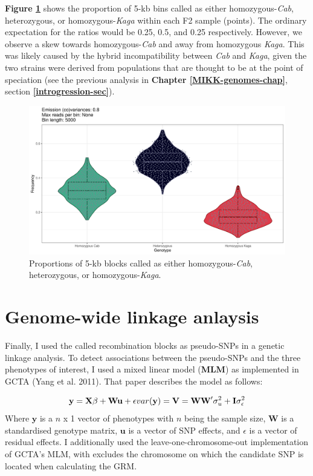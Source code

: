 \documentclass[
]{book}
\begin{document}
\textbf{Figure \ref{fig:prop-sites-total}} shows the proportion of 5-kb bins called as either homozygous-\emph{Cab}, heterozygous, or homozygous-\emph{Kaga} within each F2 sample (points). The ordinary expectation for the ratios would be 0.25, 0.5, and 0.25 respectively. However, we observe a skew towards homozygous-\emph{Cab} and away from homozygous \emph{Kaga}. This was likely caused by the hybrid incompatibility between \emph{Cab} and \emph{Kaga}, given the two strains were derived from populations that are thought to be at the point of speciation (see the previous analysis in \textbf{Chapter \ref{MIKK-genomes-chap}}, section \textbf{\ref{introgression-sec}}).



\begin{figure}
\includegraphics[width=1\linewidth]{figs/somites/prop_sites_total} \caption{Proportions of 5-kb blocks called as either homozygous-\emph{Cab}, heterozygous, or homozygous-\emph{Kaga}.}\label{fig:prop-sites-total}
\end{figure}

\clearpage

\hypertarget{somite-assoc-tests}{%
\section{Genome-wide linkage anlaysis}\label{somite-assoc-tests}}

Finally, I used the called recombination blocks as pseudo-SNPs in a genetic linkage analysis. To detect associations between the pseudo-SNPs and the three phenotypes of interest, I used a mixed linear model (\textbf{MLM}) as implemented in GCTA (Yang et al. 2011). That paper describes the model as follows:

\[
\textbf{y} = \textbf{X}\beta + \textbf{Wu} + \epsilon \\
var(\textbf{y}) = \textbf{V} = \textbf{WW}'\sigma^2_{u} + \textbf{I}\sigma_{\epsilon}^2
\]
Where \(\textbf{y}\) is a \(n\) x 1 vector of phenotypes with \(n\) being the sample size, \(\textbf{W}\) is a standardised genotype matrix, \(\textbf{u}\) is a vector of SNP effects, and \(\epsilon\) is a vector of residual effects. I additionally used the leave-one-chromosome-out implementation of GCTA's MLM, with excludes the chromosome on which the candidate SNP is located when calculating the GRM.
\end{document}
